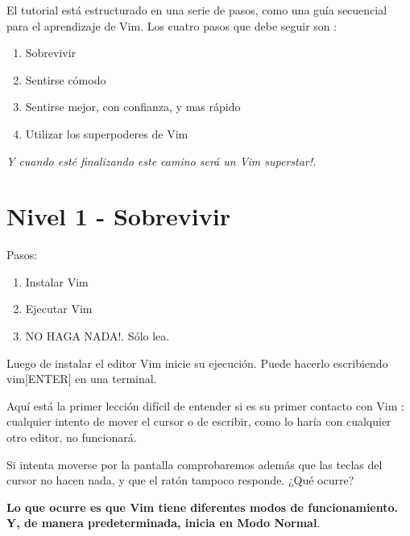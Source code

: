
El tutorial está estructurado en una serie de pasos, como una guía
secuencial para el aprendizaje de Vim. Los cuatro pasos que debe seguir son :

\begin{enumerate}
	\item Sobrevivir
	\item Sentirse cómodo
	\item Sentirse mejor, con confianza, y mas rápido
	\item Utilizar los superpoderes de Vim
\end{enumerate}

\textit{Y cuando esté finalizando este camino será un Vim superstar!.}


\section{Nivel 1 - Sobrevivir}


Pasos:

\begin{enumerate}
	\item Instalar Vim
	\item Ejecutar Vim
	\item NO HAGA NADA!. Sólo lea.
\end{enumerate}

Luego de instalar el editor Vim inicie su ejecución. Puede hacerlo
escribiendo vim[ENTER] en una terminal.

Aquí está la primer lección difícil de entender si es su primer contacto
con Vim : cualquier intento de mover el cursor o de escribir, como lo haría con cualquier otro
editor, no funcionará.

Si intenta moverse por la
pantalla comprobaremos además que las teclas del cursor no hacen nada, y que el
ratón tampoco responde.
¿Qué ocurre? 

\textbf{Lo que ocurre es que Vim tiene diferentes modos de funcionamiento.
Y, de manera predeterminada, inicia en Modo Normal}.


